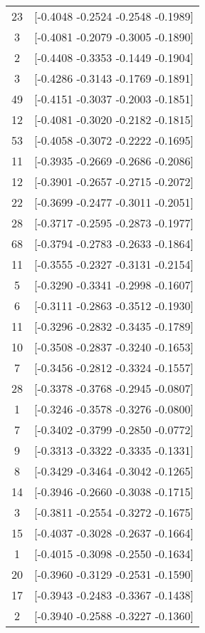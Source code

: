 \documentclass[12pt, fullpage,letterpaper]{article}
\begin{document}
\begin{enumerate}
\begin{enumerate}
{\begin{longtable}{|c|c|}
			 23 &  [-0.4048 -0.2524 -0.2548 -0.1989] \\
			  3 &  [-0.4081 -0.2079 -0.3005 -0.1890] \\
			  2 &  [-0.4408 -0.3353 -0.1449 -0.1904] \\
			  3 &  [-0.4286 -0.3143 -0.1769 -0.1891] \\
			 49 &  [-0.4151 -0.3037 -0.2003 -0.1851] \\
			 12 &  [-0.4081 -0.3020 -0.2182 -0.1815] \\
			 53 &  [-0.4058 -0.3072 -0.2222 -0.1695] \\
			 11 &  [-0.3935 -0.2669 -0.2686 -0.2086] \\
			 12 &  [-0.3901 -0.2657 -0.2715 -0.2072] \\
			 22 &  [-0.3699 -0.2477 -0.3011 -0.2051] \\
			 28 &  [-0.3717 -0.2595 -0.2873 -0.1977] \\
			 68 &  [-0.3794 -0.2783 -0.2633 -0.1864] \\
			 11 &  [-0.3555 -0.2327 -0.3131 -0.2154] \\
			  5 &  [-0.3290 -0.3341 -0.2998 -0.1607] \\
			  6 &  [-0.3111 -0.2863 -0.3512 -0.1930] \\
			 11 &  [-0.3296 -0.2832 -0.3435 -0.1789] \\
			 10 &  [-0.3508 -0.2837 -0.3240 -0.1653] \\
			  7 &  [-0.3456 -0.2812 -0.3324 -0.1557] \\
			 28 &  [-0.3378 -0.3768 -0.2945 -0.0807] \\
			  1 &  [-0.3246 -0.3578 -0.3276 -0.0800] \\
			  7 &  [-0.3402 -0.3799 -0.2850 -0.0772] \\
			  9 &  [-0.3313 -0.3322 -0.3335 -0.1331] \\
			  8 &  [-0.3429 -0.3464 -0.3042 -0.1265] \\
			 14 &  [-0.3946 -0.2660 -0.3038 -0.1715] \\
			  3 &  [-0.3811 -0.2554 -0.3272 -0.1675] \\
			 15 &  [-0.4037 -0.3028 -0.2637 -0.1664] \\
			  1 &  [-0.4015 -0.3098 -0.2550 -0.1634] \\
			 20 &  [-0.3960 -0.3129 -0.2531 -0.1590] \\
			 17 &  [-0.3943 -0.2483 -0.3367 -0.1438] \\
			  2 &  [-0.3940 -0.2588 -0.3227 -0.1360] \\

\end{longtable}}
\end{enumerate}
\end{enumerate}
\end{document}
